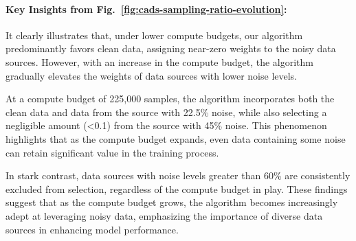 \paragraph{Key Insights from Fig.~\ref{fig:cads-sampling-ratio-evolution}:}
It clearly illustrates that, under lower compute budgets, our algorithm predominantly favors clean data, assigning near-zero weights to the noisy data sources. However, with an increase in the compute budget, the algorithm gradually elevates the weights of data sources with lower noise levels.

At a compute budget of 225,000 samples, the algorithm incorporates both the clean data and data from the source with 22.5\% noise, while also selecting a negligible amount (<0.1) from the source with 45\% noise. This phenomenon highlights that as the compute budget expands, even data containing some noise can retain significant value in the training process.

In stark contrast, data sources with noise levels greater than 60\% are consistently excluded from selection, regardless of the compute budget in play. These findings suggest that as the compute budget grows, the algorithm becomes increasingly adept at leveraging noisy data, emphasizing the importance of diverse data sources in enhancing model performance.


